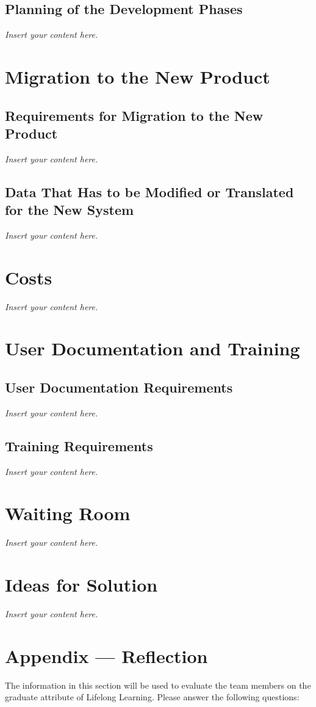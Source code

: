 \documentclass[12pt]{article}
\newcommand{\lips}{\textit{Insert your content here.}}
\begin{document}
\subsection{Planning of the Development Phases}
\lips

\section{Migration to the New Product}
\subsection{Requirements for Migration to the New Product}
\lips
\subsection{Data That Has to be Modified or Translated for the New System}
\lips

\section{Costs}
\lips
\section{User Documentation and Training}
\subsection{User Documentation Requirements}
\lips
\subsection{Training Requirements}
\lips

\section{Waiting Room}
\lips

\section{Ideas for Solution}
\lips

\newpage{}
\section*{Appendix --- Reflection}

The information in this section will be used to evaluate the team members on the
graduate attribute of Lifelong Learning.  Please answer the following questions:
\end{document}
